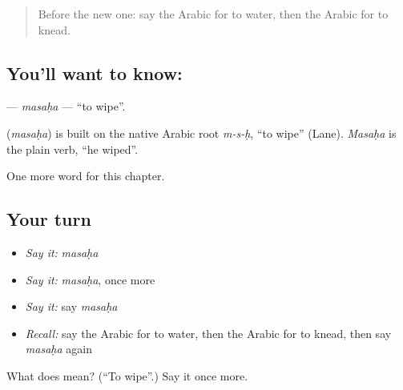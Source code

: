 \label{lesson:AR-C229-masaha}



\begin{quote}
Before the new one: say the Arabic for to water, then the Arabic for to knead.
\end{quote}

\subsection*{You'll want to know: }
\textbf{} — \emph{masaḥa} — \textquotedblleft{}to wipe\textquotedblright{}.

\begin{cousinweb}
\textbf{} (\emph{masaḥa}) is built on the native Arabic root \emph{m-s-ḥ}, \textquotedblleft{}to wipe\textquotedblright{} (Lane). \emph{Masaḥa} is the plain verb, \textquotedblleft{}he wiped\textquotedblright{}.
\end{cousinweb}

\begin{grammarlens}[title={What you've built}]
One more word for this chapter.
\end{grammarlens}

\subsection*{Your turn}
\begin{itemize}
\raggedright
  \item \emph{Say it:} \emph{masaḥa}
  \item \emph{Say it:} \emph{masaḥa}, once more
  \item \emph{Say it:} say \emph{masaḥa}
  \item \emph{Recall:} say the Arabic for to water, then the Arabic for to knead, then say \emph{masaḥa} again
\end{itemize}

\begin{tcolorbox}[breakable,colback=teal!4,colframe=teal!35!black,title={Before you move on}]
What does  mean? (\textquotedblleft{}To wipe\textquotedblright{}.) Say it once more.
\end{tcolorbox}
